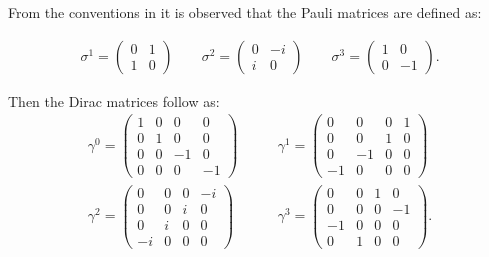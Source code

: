 \label{apx:explicitMatrices}

From the conventions in \cite{griffithspp}
it is observed that
the Pauli matrices are defined as:

\begin{align*}
\sigma^1=
\begin{pmatrix}
0 & 1\\
1 & 0
\end{pmatrix}
\qquad
\sigma^2=
\begin{pmatrix}
0 & -i\\
i & 0
\end{pmatrix}
\qquad
\sigma^3=
\begin{pmatrix}
1 & 0\\
0 & -1
\end{pmatrix}
.
\end{align*}

Then the Dirac matrices follow as:
\begin{equation} \label{eqn:gammaExplicit}
\begin{split}
\gamma^0=
\begin{pmatrix}
1 & 0 & 0 & 0\\
0 & 1 & 0 & 0 \\
0 & 0 & -1 & 0 \\
0 & 0 & 0 & -1
\end{pmatrix}
& \qquad \gamma^1 =
\begin{pmatrix}
0 & 0 & 0 & 1\\
0 & 0 & 1 & 0 \\
0 & -1 & 0 & 0 \\
-1 & 0 & 0 & 0
\end{pmatrix}
\\
\gamma^2=
\begin{pmatrix}
0 & 0 & 0 & -i\\
0 & 0 & i & 0 \\
0 & i & 0 & 0 \\
-i & 0 & 0 & 0
\end{pmatrix}
& \qquad \gamma^3 =
\begin{pmatrix}
0 & 0 & 1 & 0\\
0 & 0 & 0 & -1 \\
-1 & 0 & 0 & 0 \\
0 & 1 & 0 & 0
\end{pmatrix}
.
\end{split}
\end{equation}
\label{apx:gammaMatrixProofs}

